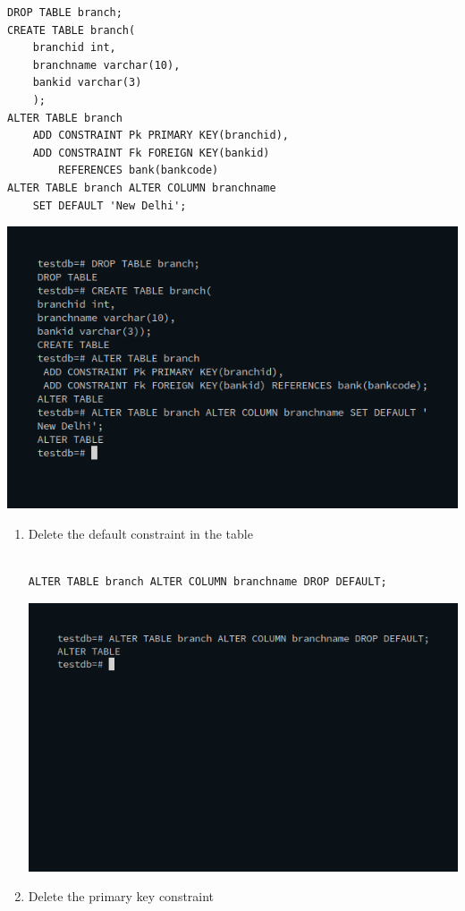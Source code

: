 \begin{enumerate}
\begin{verbatim}
DROP TABLE branch;
CREATE TABLE branch(
	branchid int,
	branchname varchar(10),
	bankid varchar(3)
	);
ALTER TABLE branch
	ADD CONSTRAINT Pk PRIMARY KEY(branchid),
	ADD CONSTRAINT Fk FOREIGN KEY(bankid) 
		REFERENCES bank(bankcode)
ALTER TABLE branch ALTER COLUMN branchname 
	SET DEFAULT 'New Delhi';

\end{verbatim}
\newline
\includegraphics[width=\linewidth]{../Images/Constraints/16.png}\newline
\begin{enumerate}
\item Delete the default constraint in the table\newline
\begin{verbatim}

ALTER TABLE branch ALTER COLUMN branchname DROP DEFAULT;

\end{verbatim}
\newline
\includegraphics[width=\linewidth]{../Images/Constraints/17.png}\newline
\item Delete the primary key constraint\newline
\begin{verbatim}


\end{verbatim}
\end{enumerate}
\end{enumerate}
